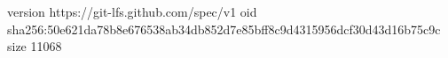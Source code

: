 version https://git-lfs.github.com/spec/v1
oid sha256:50e621da78b8e676538ab34db852d7e85bff8c9d4315956dcf30d43d16b75c9c
size 11068

